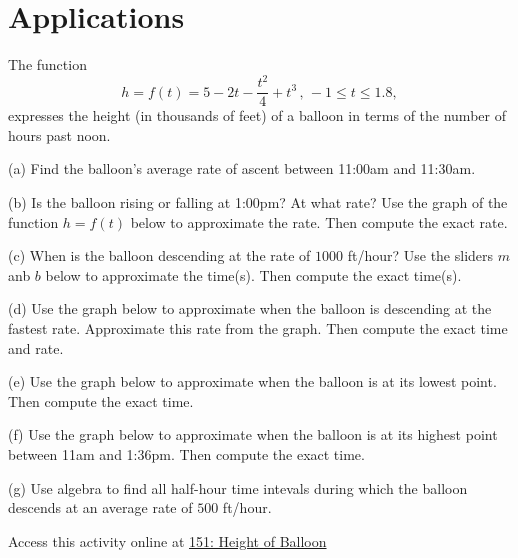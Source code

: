 \documentclass{ximera}
\begin{document}
\section*{Applications}

\begin{question}  \label{Qersdfgg4t}
The function
\[
      h = f(t) = 5 -2t -\frac{t^2}{4} + t^3 \, , \, -1\leq t \leq 1.8 ,
\]
expresses the height (in thousands of feet) of a balloon in terms of the number of hours past noon.

(a) Find the balloon's average rate of ascent between 11:00am and 11:30am.

(b) Is the balloon rising or falling at 1:00pm? At what rate? Use the graph of the function $h=f(t)$ below to approximate the rate. Then compute the exact rate.

(c) When is the balloon descending at the rate of $1000$ ft/hour? Use the sliders $m$ anb $b$ below to approximate the time(s). Then compute the exact time(s).

(d) Use the graph below to approximate when the balloon is descending at the fastest rate. Approximate this rate from the graph. Then compute the exact time and rate.

(e) Use the graph below to approximate when the balloon is at its lowest point. Then compute the exact time.

(f) Use the graph below to approximate when the balloon is at its highest point between 11am and 1:36pm. Then compute the exact time.

(g) Use algebra to find all half-hour time intevals during which the balloon descends at an average rate of $500$ ft/hour.

\begin{onlineOnly}
    \begin{center}
\end{center}
\end{onlineOnly}


Access this activity online at \href{https://www.desmos.com/calculator/occgyjoawh}{151: Height of Balloon}

\end{question}
\end{document}
